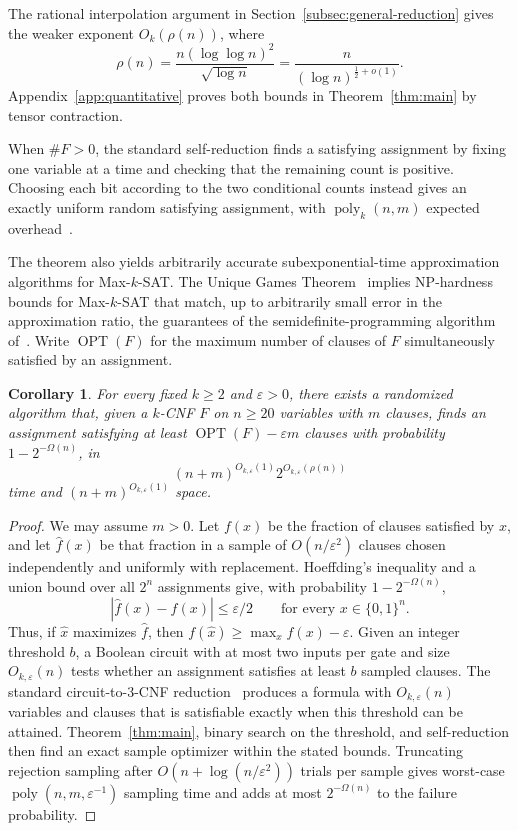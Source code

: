 \documentclass[11pt,reqno]{amsart}
\numberwithin{equation}{section}
\newtheorem{corollary}[theorem]{Corollary}
\theoremstyle{definition}\newtheorem{definition}[theorem]{Definition}
\theoremstyle{remark}\newtheorem{remark}[theorem]{Remark}
\newcommand{\poly}{\operatorname{poly}}
\renewcommand{\le}{\leqslant}
\renewcommand{\ge}{\geqslant}
\begin{document}
The rational interpolation argument in Section~\ref{subsec:general-reduction}
gives the weaker exponent $O_k(\rho(n))$, where
\[
 \rho(n)=\frac{n(\log\log n)^2}{\sqrt{\log n}}
          =\frac{n}{(\log n)^{\frac12+o(1)}}.
\]
Appendix~\ref{app:quantitative} proves both bounds in
Theorem~\ref{thm:main} by tensor contraction.

When $\#F>0$, the standard self-reduction finds a satisfying
assignment by fixing one variable at a time and checking that the
remaining count is positive. Choosing each bit according to the two
conditional counts instead gives an exactly uniform random satisfying
assignment, with $\poly_k(n,m)$ expected overhead~\cite[Theorem~3.3(1)]{JVV86}.

The theorem also yields arbitrarily accurate subexponential-time
approximation algorithms for Max-$k$-SAT.
The Unique Games
Theorem~\cite[Section~8.1]{OpenAIUGC26} implies NP-hardness bounds
for Max-$k$-SAT that match, up to arbitrarily small error in the
approximation ratio, the guarantees of the semidefinite-programming
algorithm of~\cite{Rag08}.
Write $\operatorname{OPT}(F)$ for the maximum number of clauses of $F$
simultaneously satisfied by an assignment.
\begin{corollary}\label{cor:max-sat-approximation}
For every fixed $k\ge2$ and $\varepsilon>0$, there exists a randomized
algorithm that, given a $k$-CNF $F$ on $n\ge20$ variables with $m$ clauses,
finds an assignment satisfying at least
$\operatorname{OPT}(F)-\varepsilon m$ clauses with probability
$1-2^{-\Omega(n)}$, in
\[
 (n+m)^{O_{k,\varepsilon}(1)}2^{O_{k,\varepsilon}(\rho(n))}
\]
time and $(n+m)^{O_{k,\varepsilon}(1)}$ space.
\end{corollary}
\begin{proof}
We may assume $m>0$.
Let $f(x)$ be the fraction of clauses satisfied by $x$, and let
$\widehat f(x)$ be that fraction in a sample of $O(n/\varepsilon^2)$
clauses chosen independently and uniformly with replacement.
Hoeffding's inequality and a union bound over all $2^n$ assignments
give, with probability $1-2^{-\Omega(n)}$,
\[
 |\widehat f(x)-f(x)|\le\varepsilon/2
 \qquad\text{for every }x\in\{0,1\}^n.
\]
Thus, if $\widehat x$ maximizes $\widehat f$, then
$f(\widehat x)\ge\max_x f(x)-\varepsilon$.
Given an integer threshold $b$, a Boolean circuit with at most two
inputs per gate and size $O_{k,\varepsilon}(n)$ tests whether an
assignment satisfies at least $b$ sampled clauses.
The standard circuit-to-$3$-CNF reduction~\cite[Lemmas~15.9--15.10]{Bar23}
produces a formula with $O_{k,\varepsilon}(n)$ variables and clauses
that is satisfiable exactly when this threshold can be attained.
Theorem~\ref{thm:main}, binary search on the threshold, and
self-reduction then find an exact sample optimizer within the stated bounds.
Truncating rejection sampling after $O(n+\log(n/\varepsilon^2))$
trials per sample gives worst-case $\poly(n,m,\varepsilon^{-1})$
sampling time and adds
at most $2^{-\Omega(n)}$ to the failure probability.
\end{proof}
\end{document}
